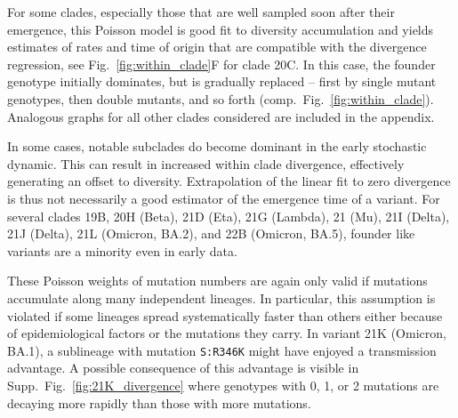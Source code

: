 \documentclass[aps,rmp, twocolumn]{revtex4}
\begin{document}
For some clades, especially those that are well sampled soon after their emergence, this Poisson model is good fit to diversity accumulation and yields estimates of rates and time of origin that are compatible with the divergence regression, see Fig.~\ref{fig:within_clade}F for clade 20C.
In this case, the founder genotype initially dominates, but is gradually replaced -- first by single mutant genotypes, then double mutants, and so forth (comp.~Fig.~\ref{fig:within_clade}).
Analogous graphs for all other clades considered are included in the appendix.

In some cases, notable subclades do become dominant in the early stochastic dynamic.
This can result in increased within clade divergence, effectively generating an offset to diversity.
Extrapolation of the linear fit to zero divergence is thus not necessarily a good estimator of the emergence time of a variant.
For several clades 19B, 20H (Beta), 21D (Eta), 21G (Lambda), 21 (Mu), 21I (Delta), 21J (Delta), 21L (Omicron, BA.2), and 22B (Omicron, BA.5), founder like variants are a minority even in early data.

These Poisson weights of mutation numbers are again only valid if mutations accumulate along many independent lineages.
In particular, this assumption is violated if some lineages spread systematically faster than others either because of epidemiological factors or the mutations they carry.
In variant 21K (Omicron, BA.1), a sublineage with mutation \texttt{S:R346K} might have enjoyed a transmission advantage.
A possible consequence of this advantage is visible in Supp.~Fig.~\ref{fig:21K_divergence} where genotypes with 0, 1, or 2 mutations are decaying more rapidly than those with more mutations.
\end{document}
